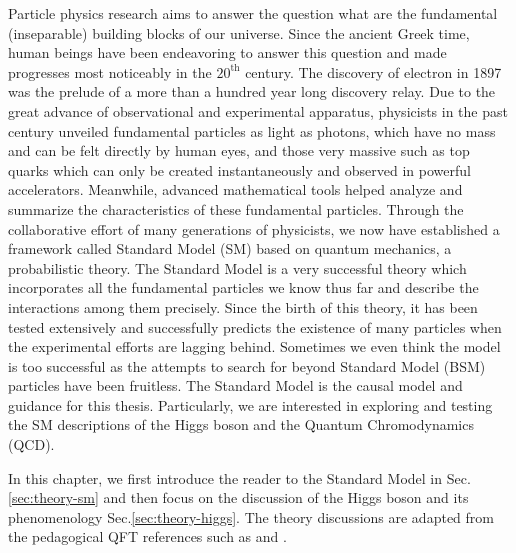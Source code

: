 Particle physics research aims to answer the question what are the fundamental (inseparable) building blocks of our universe. Since the ancient Greek time, human beings have been endeavoring to answer this question and made progresses most noticeably in the $20^{\text{th}}$ century. The discovery of electron in 1897 was the prelude of a more than a hundred year long discovery relay. Due to the great advance of observational and experimental apparatus, physicists in the past century unveiled fundamental particles as light as photons, which have no mass and can be felt directly by human eyes, and those very massive such as top quarks which can only be created instantaneously and observed in powerful accelerators. Meanwhile, advanced mathematical tools helped analyze and summarize the characteristics of these fundamental particles. Through the collaborative effort of many generations of physicists, we now have established a framework called Standard Model (SM) based on quantum mechanics, a probabilistic theory. The Standard Model is a very successful theory which incorporates all the fundamental particles we know thus far and describe the interactions among them precisely. Since the birth of this theory, it has been tested extensively and successfully predicts the existence of many particles when the experimental efforts are lagging behind. Sometimes we even think the model is too successful as the attempts to search for beyond Standard Model (BSM) particles have been fruitless. The Standard Model is the causal model and guidance for this thesis. Particularly, we are interested in exploring and testing the SM descriptions of the Higgs boson and the Quantum Chromodynamics (QCD).

In this chapter, we first introduce the reader to the Standard Model in Sec.\ref{sec:theory-sm} and then focus on the discussion of the Higgs boson and its phenomenology Sec.\ref{sec:theory-higgs}. The theory discussions are adapted from the pedagogical QFT references such as \cite{peskin} and \cite{schwartz}.
